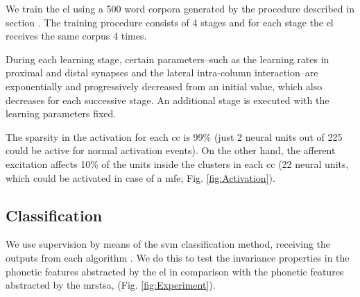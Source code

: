 \documentclass[10pt,letterpaper]{article}
\begin{document}
We train the \gls{el} using a 500 word corpora generated by the procedure described in section .
The training procedure consists of 4 stages and for each stage the \gls{el} receives the same corpus 4 times.

During each learning stage, certain parameters--such as the learning rates in proximal and distal synapses and the lateral
intra-column interaction--are exponentially and progressively decreased from an initial value, which also decreases
for each successive stage.
An additional stage is executed with the learning parameters fixed.

The sparsity in the activation for each \gls{cc} is 99\% (just 2 neural units out of 225 could be active for normal activation events).
On the other hand, the afferent excitation affects 10\% of the units inside the clusters in each \gls{cc}
(22 neural units, which could be activated in case of a \gls{mfe}; Fig. \ref{fig:Activation}).









\subsection*{ Classification}
\label{Classif}



We use supervision by means of the \gls{svm} classification
method, receiving the outputs from each algorithm \cite{CC01a, libsvm}. We do this to test the invariance properties in the phonetic features abstracted by the \gls{el} in comparison
with the phonetic features abstracted by the \gls{mrstsa}, 
(Fig. \ref{fig:Experiment}).
\end{document}
